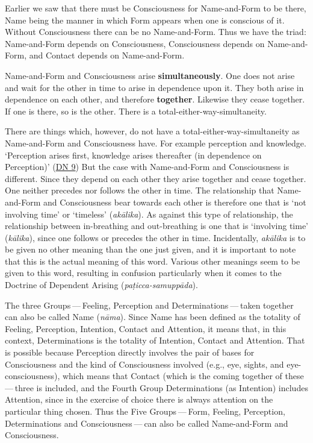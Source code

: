 Earlier we saw that there must be Consciousness for Name-and-Form to be there, Name being the manner in which Form appears when one is conscious of it. Without Consciousness there can be no Name-and-Form. Thus we have the triad: Name-and-Form depends on Consciousness, Consciousness depends on Name-and-Form, and Contact depends on Name-and-Form.

Name-and-Form and Consciousness arise \textbf{simultaneously}. One does not arise and wait for the other in time to arise in dependence upon it. They both arise in dependence on each other, and therefore \textbf{together}. Likewise they cease together. If one is there, so is the other. There is a total-either-way-simultaneity.

There are things which, however, do not have a total-either-way-simultaneity as Name-and-Form and Consciousness have. For example perception and knowledge. `Perception arises first, knowledge arises thereafter (in dependence on Perception)' (\href{https://suttacentral.net/dn9/en/thanissaro}{DN 9}) But the case with Name-and-Form and Consciousness is different. Since they depend on each other they arise together and cease together. One neither precedes nor follows the other in time. The relationship that Name-and-Form and Consciousness bear towards each other is therefore one that is `not involving time' or `timeless' (\emph{akālika}). As against this type of relationship, the relationship between in-breathing and out-breathing is one that is `involving time' (\emph{kālika}), since one follows or precedes the other in time. Incidentally, \emph{akālika} is to be given no other meaning than the one just given, and it is important to note that this is the actual meaning of this word. Various other meanings seem to be given to this word, resulting in confusion particularly when it comes to the Doctrine of Dependent Arising (\emph{paṭicca-samuppāda}).

The three Groups --- Feeling, Perception and Determinations --- taken together can also be called Name (\emph{nāma}). Since Name has been defined as the totality of Feeling, Perception, Intention, Contact and Attention, it means that, in this context, Determinations is the totality of Intention, Contact and Attention. That is possible because Perception directly involves the pair of bases for Consciousness and the kind of Consciousness involved (e.g., eye, sights, and eye-consciousness), which means that Contact (which is the coming together of these --- three is included, and the Fourth Group Determinations (as Intention) includes Attention, since in the exercise of choice there is always attention on the particular thing chosen. Thus the Five Groups --- Form, Feeling, Perception, Determinations and Consciousness --- can also be called Name-and-Form and Consciousness.
